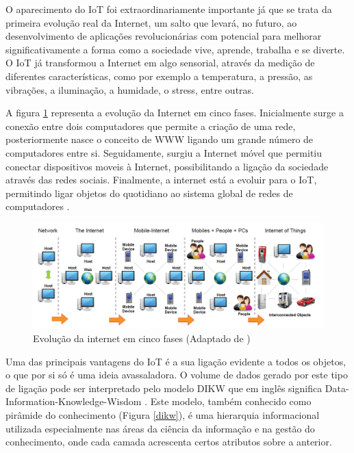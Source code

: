 O aparecimento do IoT foi extraordinariamente importante já que se trata da primeira evolução real da Internet, um salto que levará, no futuro, ao desenvolvimento de aplicações revolucionárias com potencial para melhorar significativamente a forma como a sociedade vive, aprende, trabalha e se diverte. O IoT já transformou a Internet em algo sensorial, através da medição de diferentes características, como por exemplo a temperatura, a pressão, as vibrações, a iluminação, a humidade, o stress, entre outras. 

A figura \ref{iotEvolution} representa a evolução da Internet em cinco fases. Inicialmente surge a conexão entre dois computadores que permite a criação de uma rede, posteriormente nasce o conceito de \ac{WWW} ligando um grande número de computadores entre si. Seguidamente, surgiu a Internet móvel que permitiu conectar dispositivos moveis à Internet, possibilitando a ligação da sociedade através das redes sociais.
Finalmente, a internet está a evoluir para o \ac{IoT}, permitindo ligar objetos do quotidiano ao sistema global de redes de computadores \cite{Our2013}.






\begin{figure}[!htb]
	\centering
	\includegraphics[scale=0.5]{img/cap3-iot/diagrama-evolution.png}
	\caption{Evolução da internet em cinco fases (Adaptado de \cite{Our2013})}
	\label{iotEvolution}
\end{figure}



Uma das principais vantagens do IoT é a sua ligação evidente a todos os objetos, o que por si só é uma ideia avassaladora. O volume de dados gerado por este tipo de ligação pode ser interpretado pelo modelo DIKW que em inglês significa Data-Information-Knowledge-Wisdom \cite{Rowley2007}. Este modelo, também conhecido como pirâmide do conhecimento (Figura \ref{dikw}), é uma hierarquia informacional utilizada especialmente nas áreas da ciência da informação e na gestão do conhecimento, onde cada camada acrescenta certos atributos sobre a anterior.


